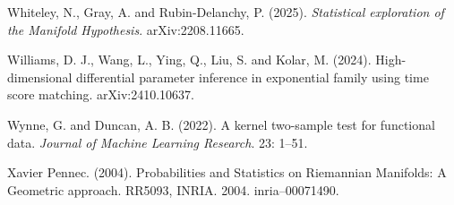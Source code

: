\begin{bookreferences}
  \item Whiteley, N., Gray, A. and Rubin-Delanchy, P. (2025). \emph{Statistical exploration of the Manifold Hypothesis}. arXiv:2208.11665.
  \item Williams, D. J., Wang, L., Ying, Q., Liu, S. and Kolar, M. (2024). High-dimensional differential parameter inference in exponential family using time score matching. arXiv:2410.10637.
  \item Wynne, G. and Duncan, A. B. (2022). A kernel two-sample test for functional data. \emph{Journal of Machine Learning Research}. 23: 1–51.
  \item Xavier Pennec. (2004). Probabilities and Statistics on Riemannian Manifolds: A Geometric approach. RR5093, INRIA. 2004. inria–00071490.
\end{bookreferences}

